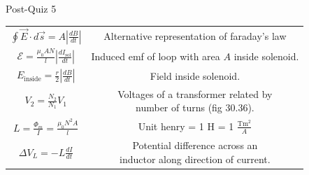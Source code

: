 \documentclass{article}
\begin{document}
\begin{center}
\begin{section}{Post-Quiz 5}
\begin{tabular}{|c|c|}
		 $\oint \vec E \cdot d \vec s = A | \frac{dB}{dt} | $                          & Alternative representation of faraday's law              \\

		 $\mathcal E = \frac{\mu_0 A N}{l} | \frac{d I_\text{sol}}{dt} | $             & Induced emf of loop with area $A$ inside solenoid.       \\

		 $E_\text{inside} = \frac{r}{2} | \frac{dB}{dt} |$                             & Field inside solenoid.                                   \\

		 $V_2 = \frac{N_2}{N_1} V_1$                                                   & \makecell{Voltages of a transformer related by           \\
		 number of turns (fig 30.36).}                                                                                                            \\

		 $L = \frac{\Phi_m}{I} = \frac{\mu_0 N^2 A}{l}$                                & Unit henry = 1 H = 1 $\frac{\text{Tm}^2}{A}$             \\

		 $\Delta V_L = -L \frac{dI}{dt}$                                               & \makecell{Potential difference across an                 \\
		 inductor along direction of current.}                                                                                                    \\


\end{tabular}
\end{section}
\end{center}
\end{document}
